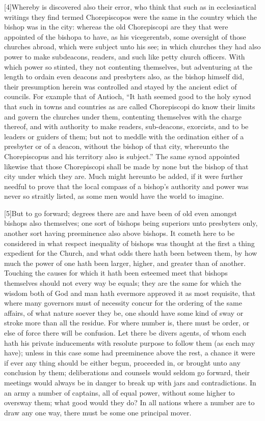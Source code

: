 [4]Whereby is discovered also their error, who think that such as in ecclesiastical writings they find termed Chorepiscopos were the same in the country which the bishop was in the city: whereas the old Chorepiscopi are they that were appointed of the bishopa to have, as his vicegerentsb, some oversight of those churches abroad, which were subject unto his  see;
 in which churches they had also power to make subdeacons, readers, and such like petty church officers. With which power so stinted, they not contenting themselves, but adventuring at the length to ordain even deacons and presbyters also, as the bishop himself did, their presumption herein was controlled and stayed by the ancient edict of councils. For example that of Antioch, “It hath seemed good to the holy synod that such in towns and countries as are called Chorepiscopi do know their limits and govern the churches under them, contenting themselves with the charge thereof, and with authority to make readers, sub-deacons, exorcists, and to be leaders or guiders of them; but not to meddle with the ordination either of a presbyter or of a deacon, without the bishop of that city, whereunto the Chorepiscopus and his territory also is subject.” The same synod appointed likewise that those Chorepiscopi shall be made by none but the bishop of that city under which they are. Much might hereunto be added, if it were further needful to prove that the local compass of a bishop’s authority and power was never so straitly listed, as some men would have the world to imagine.

[5]But to go forward; degrees there are and have been of old even amongst bishops also themselves; one sort of bishops being superiors unto presbyters only, another sort having preeminence also above bishops. It cometh here to be considered in what respect inequality of bishops was thought at the first a thing expedient for the Church, and what odds there hath been between them, by how much the power of one hath been larger, higher, and greater than of another. Touching the causes for which it hath been esteemed meet that bishops themselves should not every way be equals; they are the same for which the wisdom both of God and man hath evermore approved it as most requisite, that where many governors must of necessity concur for the ordering of the same affairs, of what  nature soever they be, one should have some kind of sway or stroke more than all the residue. For where number is, there must be order, or else of force there will be confusion. Let there be divers agents, of whom each hath his private inducements with resolute purpose to follow them (as each may have); unless in this case some had preeminence above the rest, a chance it were if ever any thing should be either begun, proceeded in, or brought unto any conclusion by them; deliberations and counsels would seldom go forward, their meetings would always be in danger to break up with jars and contradictions. In an army a number of captains, all of equal power, without some higher to oversway them; what good would they do? In all nations where a number are to draw any one way, there must be some one principal mover.

